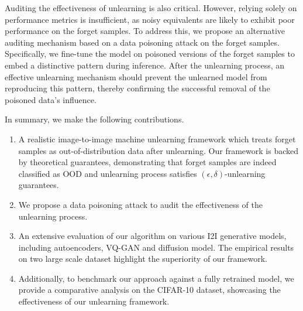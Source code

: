 

Auditing the effectiveness of unlearning is also critical. However, relying solely on performance metrics is insufficient, as noisy equivalents are likely to exhibit poor performance on the forget samples. To address this, we propose an alternative auditing mechanism based on a data poisoning attack on the forget samples. Specifically, we fine-tune the model on poisoned versions of the forget samples to embed a distinctive pattern during inference. After the unlearning process, an effective unlearning mechanism should prevent the unlearned model from reproducing this pattern, thereby confirming the successful removal of the poisoned data’s influence. 

In summary, we make the following contributions.
\begin{enumerate}
    \item A realistic image-to-image machine unlearning framework which treats forget samples as out-of-distribution data after unlearning. Our framework is backed by theoretical guarantees, demonstrating that forget samples are indeed classified as OOD and unlearning process satisfies $(\epsilon, \delta)$-unlearning guarantees.
    \item We propose a data poisoning attack to audit the effectiveness of the unlearning process.
    \item An extensive evaluation of our algorithm on various I2I generative models, including autoencoders, VQ-GAN and diffusion model. The empirical results on two large scale dataset highlight the superiority of our framework.
    \item Additionally, to benchmark our approach against a fully retrained model, we provide a comparative analysis on the CIFAR-10 dataset, showcasing the effectiveness of our unlearning framework. 
\end{enumerate}